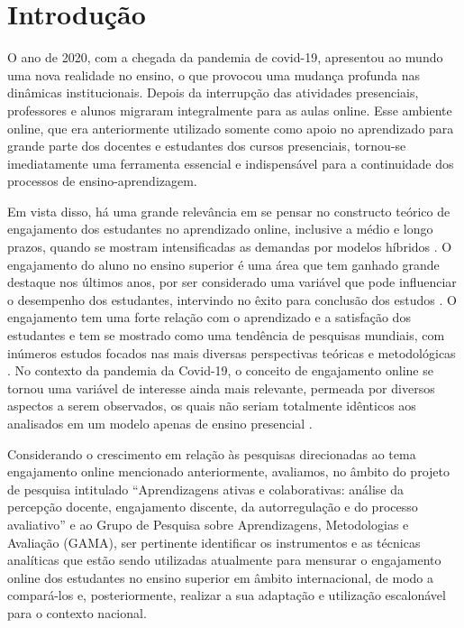 \documentclass[portuguese]{textolivre}
\begin{document}
\begin{polyabstract}
\begin{english}
\begin{abstract}
\end{abstract}
\end{english}
\end{polyabstract}

\section{Introdução}\label{sec-intro}
O ano de 2020, com a chegada da pandemia de covid-19, apresentou ao mundo uma nova realidade no ensino, o que provocou uma mudança profunda nas dinâmicas institucionais. Depois da interrupção das atividades presenciais, professores e alunos migraram integralmente para as aulas online. Esse ambiente online, que era anteriormente utilizado somente como apoio no aprendizado para grande parte dos docentes e estudantes dos cursos presenciais, tornou-se imediatamente uma ferramenta essencial e indispensável para a continuidade dos processos de ensino-aprendizagem.

Em vista disso, há uma grande relevância em se pensar no constructo teórico de engajamento dos estudantes no aprendizado online, inclusive a médio e longo prazos, quando se mostram intensificadas as demandas por modelos híbridos \cite{horn2015}. O engajamento do aluno no ensino superior é uma área que tem ganhado grande destaque nos últimos anos, por ser considerado uma variável que pode influenciar o desempenho dos estudantes, intervindo no êxito para conclusão dos estudos \cite{redmond2018}. O engajamento tem uma forte relação com o aprendizado e a satisfação dos estudantes e tem se mostrado como uma tendência de pesquisas mundiais, com inúmeros estudos focados nas mais diversas perspectivas teóricas e metodológicas \cite{hu2012}. No contexto da pandemia da Covid-19, o conceito de engajamento online se tornou uma variável de interesse ainda mais relevante, permeada por diversos aspectos a serem observados, os quais não seriam totalmente idênticos aos analisados em um modelo apenas de ensino presencial \cite{wang2021, heidari2021, shah2021}.

Considerando o crescimento em relação às pesquisas direcionadas ao tema engajamento online mencionado anteriormente, avaliamos, no âmbito do projeto de pesquisa intitulado “Aprendizagens ativas e colaborativas: análise da percepção docente, engajamento discente, da autorregulação e do processo avaliativo” e ao Grupo de Pesquisa sobre Aprendizagens, Metodologias e Avaliação (GAMA), ser pertinente identificar os instrumentos e as técnicas analíticas que estão sendo utilizadas atualmente para mensurar o engajamento online dos estudantes no ensino superior em âmbito internacional, de modo a compará-los e, posteriormente, realizar a sua adaptação e utilização escalonável para o contexto nacional.
\end{document}
